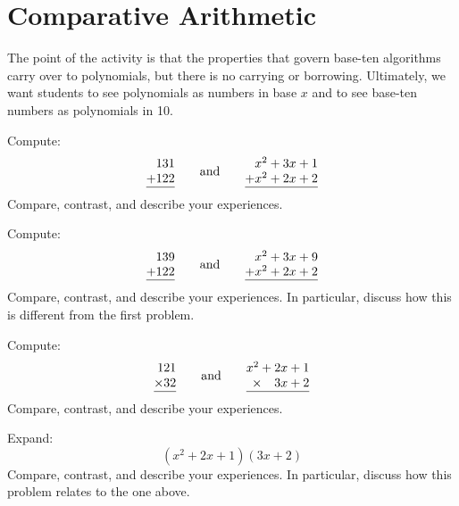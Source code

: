 \newpage
\section{Comparative Arithmetic}\label{A:CA}

\begin{teachingnote}
The point of the activity is that the properties that govern base-ten algorithms carry over to polynomials, but there is no carrying or borrowing.  Ultimately, we want students to see polynomials as numbers in base $x$ and to see base-ten numbers as polynomials in 10.
\end{teachingnote}

\begin{prob} Compute:
\[
\begin{array}{@{}r@{}}
131\\
+122\\ \hline
\end{array}
\qquad\text{and}
\qquad
\begin{array}{@{}r@{}}
x^2+3x+1\\
+x^2+2x+2\\ \hline
\end{array}
\]
Compare, contrast, and describe your experiences.
\end{prob}

\begin{prob} Compute:
\[
\begin{array}{@{}r@{}}
139\\
+122\\ \hline
\end{array}
\qquad\text{and}
\qquad
\begin{array}{@{}r@{}}
x^2+3x+9\\
+x^2+2x+2\\ \hline
\end{array}
\]
Compare, contrast, and describe your experiences. In particular,
discuss how this is different from the first problem.
\end{prob}


\begin{prob} Compute:
\[
\begin{array}{@{}r@{}}
121\\
\times 32\\ \hline
\end{array}
\qquad\text{and}
\qquad
\begin{array}{@{}r@{}}
x^2+2x+1\\
\times~~~3x+2\\ \hline
\end{array}
\]
Compare, contrast, and describe your experiences.
\end{prob}

\begin{prob}
Expand:
\[
(x^2 + 2x + 1)(3x+2)
\]
Compare, contrast, and describe your experiences. In particular, discuss how this problem relates to the one above.
\end{prob}

